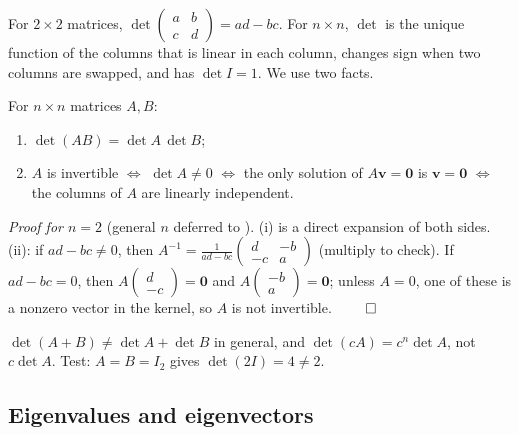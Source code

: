For $2\times 2$ matrices,
$\det\left(\begin{smallmatrix}a&b\\c&d\end{smallmatrix}\right) = ad - bc$.
For $n\times n$, $\det$ is the unique function of the columns that is linear
in each column, changes sign when two columns are swapped, and has
$\det I = 1$. We use two facts.

\begin{theorem}\label{thm:ch00-det}
For $n\times n$ matrices $A, B$:
\begin{enumerate}[label=(\roman*)]
  \item $\det(AB) = \det A\,\det B$;
  \item $A$ is invertible $\iff$ $\det A\neq 0$ $\iff$ the only solution of
        $A\mathbf{v} = \mathbf{0}$ is $\mathbf{v} = \mathbf{0}$ $\iff$ the
        columns of $A$ are linearly independent.
\end{enumerate}
\end{theorem}
\noindent\emph{Proof for $n=2$} (general $n$ deferred to
\textcite[Ch.~9]{Rudin}).
(i) is a direct expansion of both sides. (ii): if $ad - bc\neq 0$, then
$A^{-1} = \frac{1}{ad-bc}\left(\begin{smallmatrix}d&-b\\-c&a\end{smallmatrix}\right)$
(multiply to check). If $ad - bc = 0$, then
$A\left(\begin{smallmatrix}d\\-c\end{smallmatrix}\right) = \mathbf0$ and
$A\left(\begin{smallmatrix}-b\\a\end{smallmatrix}\right) = \mathbf0$; unless
$A = 0$, one of these is a nonzero vector in the kernel, so $A$ is not
invertible. $\qed$

\begin{pitfall}\label{pit:ch00-det-linear}
$\det(A + B)\neq\det A + \det B$ in general, and $\det(cA) = c^n\det A$, not
$c\det A$. Test: $A = B = I_2$ gives $\det(2I) = 4\neq 2$.
\end{pitfall}

\subsection{Eigenvalues and eigenvectors}


